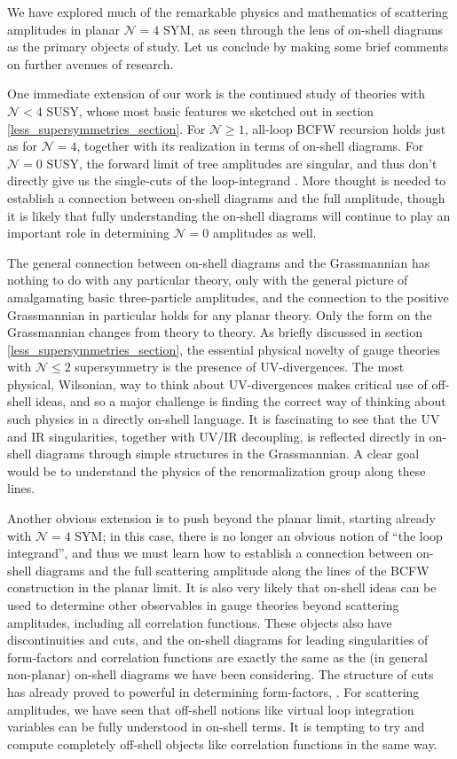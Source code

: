 \documentclass[12pt,hyperref,compress]{JHEP3}
\begin{document}
We have explored much of the remarkable physics and mathematics of scattering amplitudes in planar $\mathcal{N}\!=\!4$ SYM, as seen through the lens of on-shell diagrams as the primary objects of study. Let us conclude by making some brief comments on further avenues of research.

One immediate extension of our work is the continued study of theories with $\mathcal{N} < 4$ SUSY, whose most basic features we sketched out in section \ref{less_supersymmetries_section}. For $\mathcal{N} \geq 1$, all-loop BCFW recursion holds just as for $\mathcal{N}\!=\!4$, together with its realization in terms of on-shell diagrams. For $\mathcal{N}\!=\!0$ SUSY, the forward limit of tree amplitudes are singular, and thus don't directly give us the single-cuts of the loop-integrand \cite{CaronHuot:2010zt}. More thought is needed to establish a connection between on-shell diagrams and the full amplitude, though it is likely that fully understanding the on-shell diagrams will continue to play an important role in determining $\mathcal{N}\!=\!0$ amplitudes as well.

The general connection between on-shell diagrams and the Grassmannian has nothing to do with any particular theory, only with the general picture of amalgamating basic three-particle amplitudes, and the connection to the positive Grassmannian in particular holds for any planar theory. Only the form on the Grassmannian changes from theory to theory. As briefly discussed in section \ref{less_supersymmetries_section}, the essential physical novelty of gauge theories with $\mathcal{N} \leq 2$ supersymmetry is the presence of UV-divergences. The most physical, Wilsonian, way to think about UV-divergences makes critical use of off-shell ideas, and so a major challenge is finding the correct way of thinking about such physics in a directly on-shell language. It is fascinating to see that the UV and IR singularities, together with UV/IR decoupling, is reflected directly in on-shell diagrams through simple structures in the Grassmannian. A clear goal would be to understand the physics of the renormalization group along these lines.

Another obvious extension is to push beyond the planar limit, starting already with $\mathcal{N}\!=\!4$ SYM; in this case, there is no longer an obvious notion of ``the loop integrand'',  and thus we must learn how to establish a connection between on-shell diagrams and the full scattering amplitude along the lines of the BCFW construction in the planar limit. It is also very likely that on-shell ideas can be used to determine other observables in gauge theories beyond scattering amplitudes, including all correlation functions. These objects also have discontinuities and cuts, and the on-shell diagrams for leading singularities of form-factors and correlation functions are exactly the same as the (in general non-planar) on-shell diagrams we have been considering. The structure of cuts has already proved to powerful in determining form-factors, \cite{Brandhuber:2011tv}. For scattering amplitudes, we have seen that off-shell notions like virtual loop integration variables can be fully understood in on-shell terms. It is tempting to try and compute completely off-shell objects like correlation functions in the same way.
\end{document}
